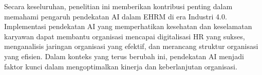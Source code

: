 \documentclass[12pt]{article}
\begin{document}
Secara keseluruhan, penelitian ini memberikan kontribusi penting dalam memahami pengaruh pendekatan AI dalam EHRM di era Industri 4.0. Implementasi pendekatan AI yang memperhatikan kesehatan dan keselamatan karyawan dapat membantu organisasi mencapai digitalisasi HR yang sukses, menganalisis jaringan organisasi yang efektif, dan merancang struktur organisasi yang efisien. Dalam konteks yang terus berubah ini, pendekatan AI menjadi faktor kunci dalam mengoptimalkan kinerja dan keberlanjutan organisasi.


\end{document}
